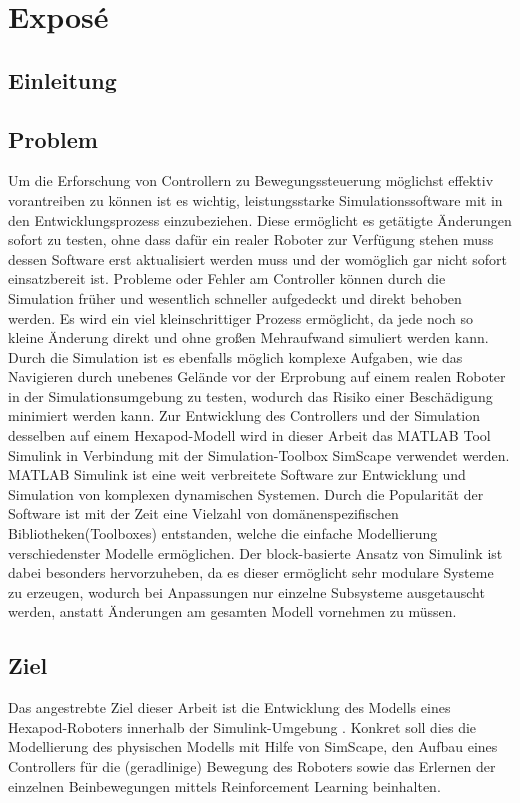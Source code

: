 \chapter{Exposé}
\label{ch:expose}



\section{Einleitung}

\section{Problem}
Um die Erforschung von Controllern zu Bewegungssteuerung möglichst effektiv vorantreiben zu können ist es wichtig, leistungsstarke Simulationssoftware mit in den Entwicklungsprozess einzubeziehen.
Diese ermöglicht es getätigte Änderungen sofort zu testen, ohne dass dafür ein realer Roboter zur Verfügung stehen muss dessen Software erst aktualisiert werden muss und der womöglich gar nicht sofort einsatzbereit ist.
Probleme oder Fehler am Controller können durch die Simulation früher und wesentlich schneller aufgedeckt und direkt behoben werden.
Es wird ein viel kleinschrittiger Prozess ermöglicht, da jede noch so kleine Änderung direkt und ohne großen Mehraufwand simuliert werden kann.
Durch die Simulation ist es ebenfalls möglich komplexe Aufgaben, wie das Navigieren durch unebenes Gelände vor der Erprobung auf einem realen Roboter in der Simulationsumgebung zu testen, wodurch  das Risiko einer Beschädigung minimiert werden kann.
Zur Entwicklung des Controllers und der Simulation desselben auf einem Hexapod-Modell wird in dieser Arbeit das MATLAB Tool Simulink in Verbindung mit der Simulation-Toolbox SimScape verwendet werden.
MATLAB Simulink ist eine weit verbreitete Software zur Entwicklung und Simulation von komplexen dynamischen Systemen.
Durch die Popularität der Software ist mit der Zeit eine Vielzahl von domänenspezifischen Bibliotheken(Toolboxes) entstanden, welche die einfache Modellierung verschiedenster Modelle ermöglichen.
Der block-basierte Ansatz von Simulink ist dabei besonders hervorzuheben, da es dieser ermöglicht sehr modulare Systeme zu erzeugen, wodurch bei Anpassungen nur einzelne Subsysteme ausgetauscht werden, anstatt Änderungen am gesamten Modell vornehmen zu müssen.

\section{Ziel}
Das angestrebte Ziel dieser Arbeit ist die Entwicklung des Modells eines Hexapod-Roboters innerhalb der Simulink-Umgebung \cite{MusterPaper}.
Konkret soll dies die Modellierung des physischen Modells mit Hilfe von SimScape, den Aufbau eines Controllers für die (geradlinige) Bewegung des Roboters sowie das Erlernen der einzelnen Beinbewegungen mittels Reinforcement Learning beinhalten.

